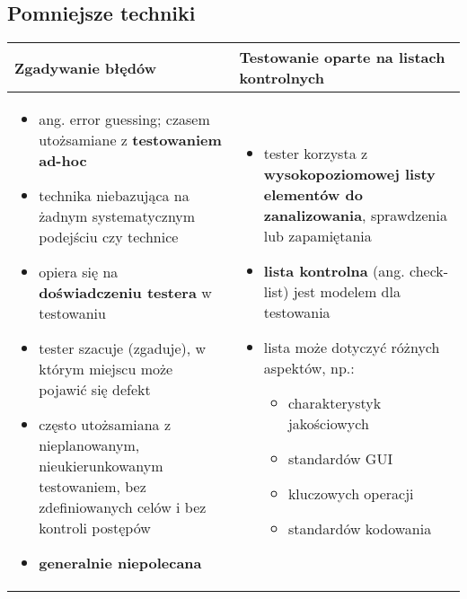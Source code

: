 \documentclass[../main.tex]{subfiles}
\begin{document}
    \subsection{Pomniejsze techniki}

    \begin{table}[H]
        \begin{center}
            \begin{tabular}{| p{8cm} | p{8cm} |}
                \hline
                \textbf{Zgadywanie błędów} & \textbf{Testowanie oparte na listach kontrolnych} \\
                \hline
                \begin{itemize}
                    \item ang. error guessing; czasem utożsamiane z \textbf{testowaniem ad-hoc}
                    \item technika niebazująca na żadnym systematycznym podejściu czy technice
                    \item opiera się na \textbf{doświadczeniu testera} w testowaniu
                    \item tester szacuje (zgaduje), w którym miejscu może pojawić się defekt
                    \item często utożsamiana z nieplanowanym, nieukierunkowanym testowaniem, bez zdefiniowanych celów i bez kontroli postępów
                    \item \textbf{generalnie niepolecana}
                \end{itemize}
                &
                \begin{itemize}
                    \item tester korzysta z \textbf{wysokopoziomowej listy elementów do
                    zanalizowania}, sprawdzenia lub zapamiętania
                    \item \textbf{lista kontrolna} (ang. check-list) jest modelem dla testowania
                    \item lista może dotyczyć różnych aspektów, np.:
                    \begin{itemize}
                        \item charakterystyk jakościowych
                        \item standardów GUI
                        \item kluczowych operacji
                        \item standardów kodowania
                    \end{itemize}

\end{itemize}
\end{tabular}
\end{center}
\end{table}
\end{document}
